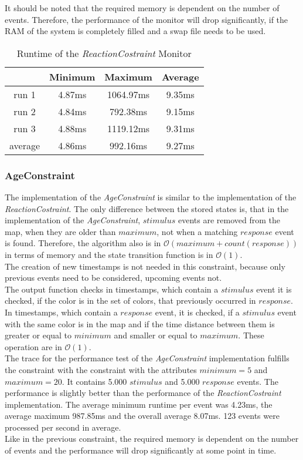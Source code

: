 	It should be noted that the required memory is dependent on the number of events. Therefore, the performance of the monitor will drop significantly, if the RAM of the system is completely filled and a swap file needs to be used.
	\begin{table}
		\begin{tabular}{|c|c|c|c|}
			\hline
					& Minimum & Maximum & Average \\
			\hline
			run 1	& 4.87ms & 1064.97ms & 9.35ms \\
			\hline
			run 2	& 4.84ms & 792.38ms & 9.15ms\\
			\hline
			run 3	& 4.88ms & 1119.12ms & 9.31ms\\
			\hline
			average & 4.86ms & 992.16ms & 9.27ms\\
			\hline
		\end{tabular}
		\centering
		\label{tab:runtimeReactionCostraint}
		\caption{Runtime of the \emph{ReactionCostraint} Monitor}
	\end{table}
	
\subsubsection{AgeConstraint}
	The implementation of the \emph{AgeConstraint} is similar to the implementation of the \emph{ReactionCostraint}. The only difference between the stored states is, that in the implementation of the \emph{AgeConstraint}, $stimulus$ events are removed from the map, when they are older than $maximum$, not when a matching $response$ event is found. Therefore, the algorithm also is in $\mathcal{O}(maximum+count(response))$ in terms of memory and the state transition function is in $\mathcal{O}(1)$.\\
	The creation of new timestamps is not needed in this constraint, because only previous events need to be considered, upcoming events not.\\
	The output function checks in timestamps, which contain a $stimulus$ event it is checked, if the color is in the set of colors, that previously occurred in $response$. In timestamps, which contain a $response$ event, it is checked, if a $stimulus$ event with the same color is in the map and if the time distance between them is greater or equal to $minimum$ and smaller or equal to $maximum$. These operation are in $\mathcal{O}(1)$.\\
	The trace for the performance test of the \emph{AgeConstraint} implementation fulfills the constraint with the constraint with the attributes $minimum=5$ and $maximum=20$. It contains 5.000 $stimulus$ and 5.000 $response$ events. The performance is slightly better than the performance of the \emph{ReactionCostraint} implementation. The average minimum runtime per event was 4.23ms, the average maximum 987.85ms and the overall average 8.07ms. 123 events were processed per second in average.\\
	Like in the previous constraint, the required memory is dependent on the number of events and the performance will drop significantly at some point in time.
	
